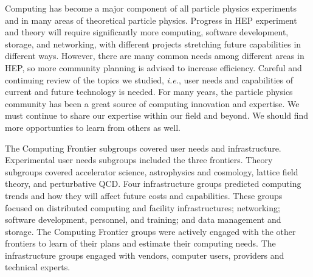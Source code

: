 Computing has become a major component of all particle physics experiments
and in many areas of theoretical particle physics. 
Progress in HEP experiment and theory will require significantly more
computing, software development, storage, and networking, with different
projects stretching future capabilities in different ways.  However, there
are many common needs among different areas in HEP, so more
community planning is advised to increase efficiency.
Careful and continuing review of the topics we studied, 
{\it i.e.}, user needs and capabilities of
current and future technology is needed.  For many years, the particle physics
community has been a great source of computing innovation and expertise. 
We must continue to share our expertise within our field and beyond.
We should find more opportunties to learn from others as well.

The Computing Frontier
subgroups covered user needs and infrastructure.
Experimental user needs subgroups included the three frontiers.
Theory subgroups covered accelerator science,
astrophysics and cosmology, lattice field theory, and perturbative QCD.
Four infrastructure groups predicted computing trends and
how they will affect future costs and
capabilities. These groups focused on distributed computing and facility
infrastructures; networking; software development, personnel, and training; and
data management and storage. 
The Computing
Frontier groups were actively engaged with the other frontiers to learn of
their plans and estimate their computing needs.  The infrastructure groups
engaged with vendors, computer users, providers and technical experts. 

